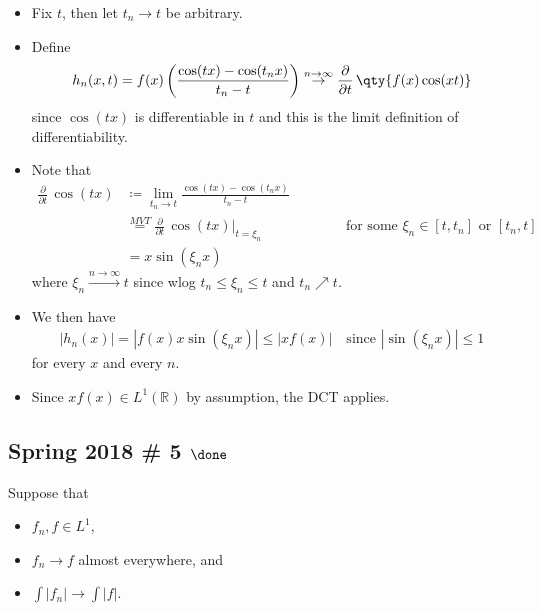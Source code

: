 \begin{solution}
\begin{itemize}
\item
  Fix \(t\), then let \(t_n \to t\) be arbitrary.
\item
  Define
  \begin{align*}
  h_n(x, t) = f(x)
  \left(\frac{\cos(tx) - \cos(t_n x)}{t_n - t}\right) \overset{n\to\infty}\to {\frac{\partial }{\partial t}\,} \qty{f(x) \cos(xt)}
  \end{align*}
  since \(\cos(tx)\) is differentiable in \(t\) and this is the limit
  definition of differentiability.
\item
  Note that
  \begin{align*}
  {\frac{\partial }{\partial t}\,} \cos(tx) 
  &\coloneqq\lim_{t_n \to t} \frac{\cos(tx) - \cos(t_n x)}{t_n - t} \\
  &\overset{MVT} = {\frac{\partial }{\partial t}\,}\cos(tx)\mathrel{\Big|}_{t  = \xi_n} \hspace{6em} \text{for some } \xi_n \in [t, t_n] \text{ or } [t_n, t] \\
  &= x\sin(\xi_n x)
  \end{align*}
  where \(\xi_n \overset{n\to\infty}\to t\) since wlog
  \(t_n \leq \xi_n \leq t\) and \(t_n \nearrow t\).
\item
  We then have
  \begin{align*}{\left\lvert {h_n(x)} \right\rvert} = {\left\lvert {f(x) x\sin(\xi_n x)} \right\rvert} \leq {\left\lvert {xf(x)} \right\rvert}\quad\text{since } {\left\lvert {\sin(\xi_n x)} \right\rvert} \leq  1\end{align*}
  for every \(x\) and every \(n\).
\item
  Since \(xf(x) \in L^1({\mathbb{R}})\) by assumption, the DCT applies.
\end{itemize}

\end{solution}

\hypertarget{spring-2018-5-done}{%
\subsection{\texorpdfstring{Spring 2018 \# 5
\(\done\)}{Spring 2018 \# 5 \textbackslash done}}\label{spring-2018-5-done}}

Suppose that

\begin{itemize}
\tightlist
\item
  \(f_n, f \in L^1\),
\item
  \(f_n \to f\) almost everywhere, and
\item
  \(\int\left|f_{n}\right| \rightarrow \int|f|\).
\end{itemize}


